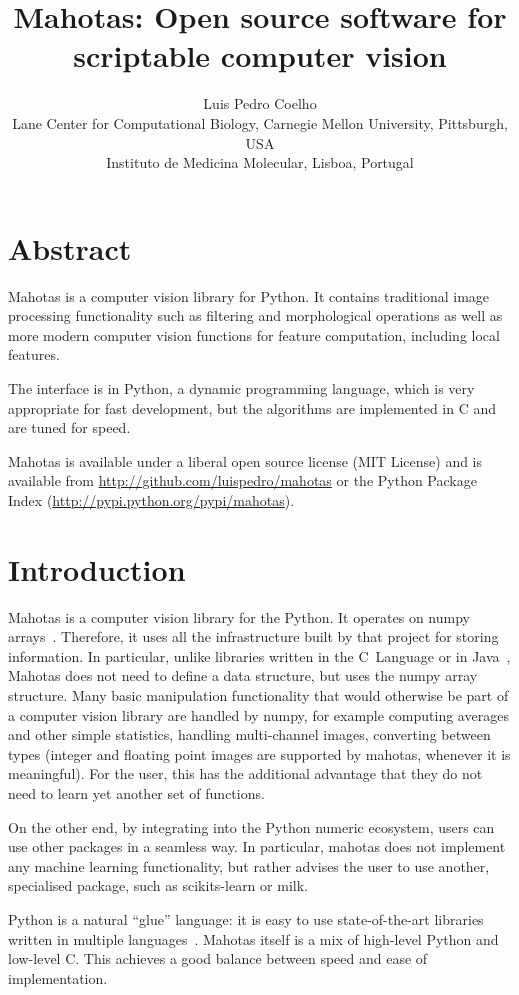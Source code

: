 \documentclass{article}
\title{Mahotas: Open source software for scriptable computer vision}
\author{Luis Pedro Coelho\\
Lane Center for Computational Biology, Carnegie Mellon University, Pittsburgh, USA\\
Instituto de Medicina Molecular, Lisboa, Portugal}
\newcommand*{\cpp}{{C\nolinebreak[4]\hspace{-.05em}\raisebox{.4ex}{\tiny\textbf{++}}}}
\begin{document}
\maketitle

\section*{Abstract}
Mahotas is a computer vision library for Python. It contains traditional image
processing functionality such as filtering and morphological operations as well
as more modern computer vision functions for feature computation, including
local features.

The interface is in Python, a dynamic programming language, which is very
appropriate for fast development, but the algorithms are implemented in \cpp{}
and are tuned for speed.

Mahotas is available under a liberal open source license (MIT License) and is
available from \url{http://github.com/luispedro/mahotas} or the Python Package
Index (\url{http://pypi.python.org/pypi/mahotas}).

\section{Introduction}

Mahotas is a computer vision library for the Python. It operates on numpy
arrays~\citep{numpystructure}. Therefore, it uses all the infrastructure built
by that project for storing information. In particular, unlike libraries
written in the C~Language or in Java~\citep{Marcel:2010:TMP:1873951.1874254},
Mahotas does not need to define a data structure, but uses the numpy array
structure. Many basic manipulation functionality that would otherwise be part
of a computer vision library are handled by numpy, for example computing
averages and other simple statistics, handling multi-channel images, converting
between types (integer and floating point images are supported by mahotas,
whenever it is meaningful). For the user, this has the additional advantage
that they do not need to learn yet another set of functions.

On the other end, by integrating into the Python numeric ecosystem, users can
use other packages in a seamless way. In particular, mahotas does not implement
any machine learning functionality, but rather advises the user to use another,
specialised package, such as scikits-learn or milk.

Python is a natural ``glue'' language: it is easy to use state-of-the-art
libraries written in multiple languages~\citep{10.1109/MCSE.2007.58}. Mahotas
itself is a mix of high-level Python and low-level \cpp{}. This achieves a good
balance between speed and ease of implementation.
\end{document}

